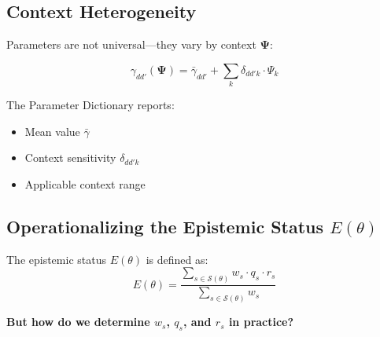 \documentclass[11pt,a4paper]{article}
\theoremstyle{definition}
\begin{document}
\subsection{Context Heterogeneity}

Parameters are not universal---they vary by context $\boldsymbol{\Psi}$:

\begin{equation}
\gamma_{dd'}(\boldsymbol{\Psi}) = \bar{\gamma}_{dd'} + \sum_k \delta_{dd'k} \cdot \Psi_k
\end{equation}

The Parameter Dictionary reports:
\begin{itemize}
    \item Mean value $\bar{\gamma}$
    \item Context sensitivity $\delta_{dd'k}$
    \item Applicable context range
\end{itemize}




\subsection{Operationalizing the Epistemic Status $E(\theta)$}
\label{sec:bbb-e-theta-operational}

The epistemic status $E(\theta)$ is defined as:
\begin{equation}
E(\theta) = \frac{\sum_{s \in \mathcal{S}(\theta)} w_s \cdot q_s \cdot r_s}{\sum_{s \in \mathcal{S}(\theta)} w_s}
\end{equation}

\textbf{But how do we determine $w_s$, $q_s$, and $r_s$ in practice?}
\end{document}
